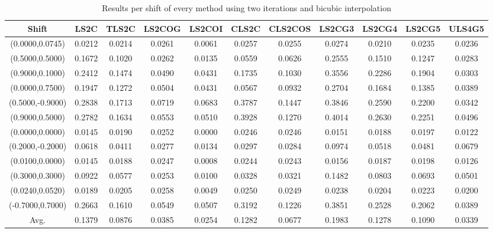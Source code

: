 \begin{table}[ht!]
\centering
\begin{tabular}{c|c|c|c|c|c|c|c|c|c|c}
Shift & \scriptsize{LS2C} & \scriptsize{TLS2C} & \scriptsize{LS2COG} & \scriptsize{LS2COI} & \scriptsize{CLS2C} & \scriptsize{CLS2COS} & \scriptsize{LS2CG3} & \scriptsize{LS2CG4} & \scriptsize{LS2CG5} & \scriptsize{ULS4G5}\\ \hline 
(0.0000,0.0745) & 0.0212 & 0.0214 & 0.0261 & 0.0061 & 0.0257 & 0.0255 & 0.0274 & 0.0210 & 0.0235 & 0.0236 \\ \hline
(0.5000,0.5000) & 0.1672 & 0.1020 & 0.0262 & 0.0135 & 0.0559 & 0.0626 & 0.2555 & 0.1510 & 0.1247 & 0.0283 \\ \hline
(0.9000,0.1000) & 0.2412 & 0.1474 & 0.0490 & 0.0431 & 0.1735 & 0.1030 & 0.3556 & 0.2286 & 0.1904 & 0.0303 \\ \hline
(0.0000,0.7500) & 0.1947 & 0.1272 & 0.0504 & 0.0431 & 0.0567 & 0.0932 & 0.2704 & 0.1684 & 0.1385 & 0.0389 \\ \hline
(0.5000,-0.9000) & 0.2838 & 0.1713 & 0.0719 & 0.0683 & 0.3787 & 0.1447 & 0.3846 & 0.2590 & 0.2200 & 0.0342 \\ \hline
(0.9000,0.5000) & 0.2782 & 0.1634 & 0.0553 & 0.0510 & 0.3928 & 0.1270 & 0.4014 & 0.2630 & 0.2251 & 0.0496 \\ \hline
(0.0000,0.0000) & 0.0145 & 0.0190 & 0.0252 & 0.0000 & 0.0246 & 0.0246 & 0.0151 & 0.0188 & 0.0197 & 0.0122 \\ \hline
(0.2000,-0.2000) & 0.0618 & 0.0411 & 0.0277 & 0.0134 & 0.0297 & 0.0284 & 0.0974 & 0.0518 & 0.0481 & 0.0679 \\ \hline
(0.0100,0.0000) & 0.0145 & 0.0188 & 0.0247 & 0.0008 & 0.0244 & 0.0243 & 0.0156 & 0.0187 & 0.0198 & 0.0126 \\ \hline
(0.3000,0.3000) & 0.0922 & 0.0577 & 0.0253 & 0.0100 & 0.0328 & 0.0321 & 0.1482 & 0.0803 & 0.0693 & 0.0501 \\ \hline
(0.0240,0.0520) & 0.0189 & 0.0205 & 0.0258 & 0.0049 & 0.0250 & 0.0249 & 0.0238 & 0.0204 & 0.0223 & 0.0200 \\ \hline
(-0.7000,0.7000) & 0.2663 & 0.1610 & 0.0549 & 0.0507 & 0.3192 & 0.1226 & 0.3851 & 0.2528 & 0.2062 & 0.0389 \\ \hline
Avg.  & 0.1379 & 0.0876 & 0.0385 & 0.0254 & 0.1282 & 0.0677 & 0.1983 & 0.1278 & 0.1090 & 0.0339 \\ \hline
\end{tabular}
\caption{Results per shift of every method using two iterations and bicubic interpolation}
\label{tab:2itCperShift}
\end{table}



